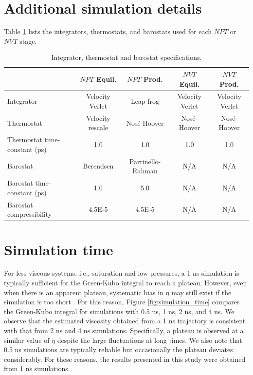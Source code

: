 \documentclass[preprint,review,12pt]{elsarticle}
\begin{document}
	\newpage

    \section{Additional simulation details} \label{Additional simulation details}
    
    Table \ref{tab:thermostats_barostats} lists the integrators, thermostats, and barostats used for each $NPT$ or $NVT$ stage.
    
    \begin{table}[htbp!]
    	\caption{Integrator, thermostat and barostat specifications.} \label{tab:thermostats_barostats}
    		\begin{tabular}{|p{2.6cm}|c|c|c|c|}
    			\hline
    			& $NPT$ Equil. & $NPT$ Prod. & $NVT$ Equil. & $NVT$ Prod. \\ \hline
    			Integrator & Velocity Verlet & Leap frog & Velocity Verlet & Velocity Verlet \\ \hline 
    			Thermostat & Velocity rescale & Nos{\'e}-Hoover & Nos{\'e}-Hoover & Nos{\'e}-Hoover \\ \hline 
    			Thermostat time-constant (ps) & 1.0 & 1.0 & 1.0 & 1.0 \\ \hline
    			Barostat & Berendsen & Parrinello-Rahman & N/A & N/A \\ \hline
    			Barostat time-constant (ps) & 1.0 & 5.0 & N/A & N/A \\ \hline
    			Barostat compressibility & 4.5E-5 & 4.5E-5 & N/A & N/A \\
    			\hline
    		\end{tabular}
    \end{table}
    
	\newpage
		
	\section{Simulation time} \label{SI:Simulation time}
	
	
	For less viscous systems, i.e., saturation and low pressures, a 1 ns simulation is typically sufficient for the Green-Kubo integral to reach a plateau. However, even when there is an apparent plateau, systematic bias in $\eta$ may still exist if the simulation is too short \cite{Maginn2018,Zhang2015}. For this reason, Figure \ref{fig:simulation_time} compares the Green-Kubo integral for simulations with 0.5 ns, 1 ns, 2 ns, and 4 ns. We observe that the estimated viscosity obtained from a 1 ns trajectory is consistent with that from 2 ns and 4 ns simulations. Specifically, a plateau is observed at a similar value of $\eta$ despite the large fluctuations at long times. We also note that 0.5 ns simulations are typically reliable but occasionally the plateau deviates considerably. For these reasons, the results presented in this study were obtained from 1 ns simulations.
	
\end{document}
